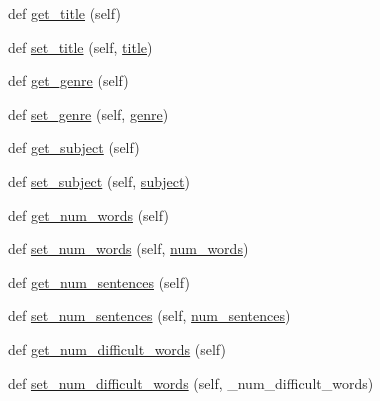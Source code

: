 \begin{DoxyCompactItemize}
\item 
def \hyperlink{class_bridges_1_1data__src__dependent_1_1gutenberg__book_1_1_gutenberg_book_ad1639feeffd55101180e0240691d67dd}{get\+\_\+title} (self)
\item 
def \hyperlink{class_bridges_1_1data__src__dependent_1_1gutenberg__book_1_1_gutenberg_book_aea80d27be5b8f28de29b6753b3a7b9d4}{set\+\_\+title} (self, \hyperlink{class_bridges_1_1data__src__dependent_1_1gutenberg__book_1_1_gutenberg_book_ae290c959c98a7f5ef4452b4da0b36bce}{title})
\item 
def \hyperlink{class_bridges_1_1data__src__dependent_1_1gutenberg__book_1_1_gutenberg_book_a4f7c1411c90aa3ef20e1a351aad9aa47}{get\+\_\+genre} (self)
\item 
def \hyperlink{class_bridges_1_1data__src__dependent_1_1gutenberg__book_1_1_gutenberg_book_a92c88741d401a37e48f15cf4f992ec98}{set\+\_\+genre} (self, \hyperlink{class_bridges_1_1data__src__dependent_1_1gutenberg__book_1_1_gutenberg_book_aa809da2b0cf7af7c339c8e0b0ff94f7c}{genre})
\item 
def \hyperlink{class_bridges_1_1data__src__dependent_1_1gutenberg__book_1_1_gutenberg_book_abc76038c8732dc9fcf37b763a8c56f8f}{get\+\_\+subject} (self)
\item 
def \hyperlink{class_bridges_1_1data__src__dependent_1_1gutenberg__book_1_1_gutenberg_book_a8a0b20215c0a55d818b3a859a3f8736e}{set\+\_\+subject} (self, \hyperlink{class_bridges_1_1data__src__dependent_1_1gutenberg__book_1_1_gutenberg_book_acb11cd4bf2cd8a7c8d3c6ddd6838aeb7}{subject})
\item 
def \hyperlink{class_bridges_1_1data__src__dependent_1_1gutenberg__book_1_1_gutenberg_book_ab3d6645ffb0e79213c49454e66eacc07}{get\+\_\+num\+\_\+words} (self)
\item 
def \hyperlink{class_bridges_1_1data__src__dependent_1_1gutenberg__book_1_1_gutenberg_book_a1b8932e21d0ac2a4423f666d851230d5}{set\+\_\+num\+\_\+words} (self, \hyperlink{class_bridges_1_1data__src__dependent_1_1gutenberg__book_1_1_gutenberg_book_aa7e95a987925c421e3662c6e324269b1}{num\+\_\+words})
\item 
def \hyperlink{class_bridges_1_1data__src__dependent_1_1gutenberg__book_1_1_gutenberg_book_a06ce35d693a9565691df35bfff48ed5b}{get\+\_\+num\+\_\+sentences} (self)
\item 
def \hyperlink{class_bridges_1_1data__src__dependent_1_1gutenberg__book_1_1_gutenberg_book_a3f05715ddc5574a7ccf5ad7ce3d5d293}{set\+\_\+num\+\_\+sentences} (self, \hyperlink{class_bridges_1_1data__src__dependent_1_1gutenberg__book_1_1_gutenberg_book_a462f919739f4139c99045daed4ca9e03}{num\+\_\+sentences})
\item 
def \hyperlink{class_bridges_1_1data__src__dependent_1_1gutenberg__book_1_1_gutenberg_book_a024ed1f87a77005e79bd748881031107}{get\+\_\+num\+\_\+difficult\+\_\+words} (self)
\item 
def \hyperlink{class_bridges_1_1data__src__dependent_1_1gutenberg__book_1_1_gutenberg_book_a7879976d50fbedca775ce072e318174b}{set\+\_\+num\+\_\+difficult\+\_\+words} (self, \+\_\+num\+\_\+difficult\+\_\+words)
\end{DoxyCompactItemize}
